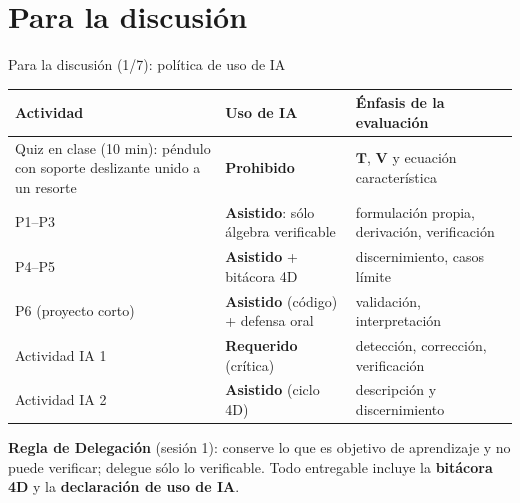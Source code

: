 \documentclass[spanish]{beamer}
\newcommand{\Tm}{\mathbf{T}}              %
\newcommand{\Vm}{\mathbf{V}}              %
\begin{document}
\section{Para la discusión}
\begin{frame}{Para la discusión (1/7): política de uso de IA}
\footnotesize
\begin{tabular}{@{}L{0.36\textwidth}L{0.27\textwidth}L{0.28\textwidth}@{}}
\toprule
\textbf{Actividad} & \textbf{Uso de IA} & \textbf{Énfasis de la evaluación}\\
\midrule
Quiz en clase (10 min): péndulo con soporte deslizante unido a un resorte & \textbf{Prohibido} & $\Tm$, $\Vm$ y ecuación característica \\
P1--P3 & \textbf{Asistido}: sólo álgebra verificable & formulación propia, derivación, verificación \\
P4--P5 & \textbf{Asistido} + bitácora 4D & discernimiento, casos límite \\
P6 (proyecto corto) & \textbf{Asistido} (código) + defensa oral & validación, interpretación \\
Actividad IA 1 & \textbf{Requerido} (crítica) & detección, corrección, verificación \\
Actividad IA 2 & \textbf{Asistido} (ciclo 4D) & descripción y discernimiento \\
\bottomrule
\end{tabular}

\medskip
\small
\textbf{Regla de Delegación} (sesión 1): conserve lo que es objetivo de aprendizaje y no puede verificar; delegue sólo lo verificable. Todo entregable incluye la \textbf{bitácora 4D} y la \textbf{declaración de uso de IA}.
\end{frame}
\end{document}
